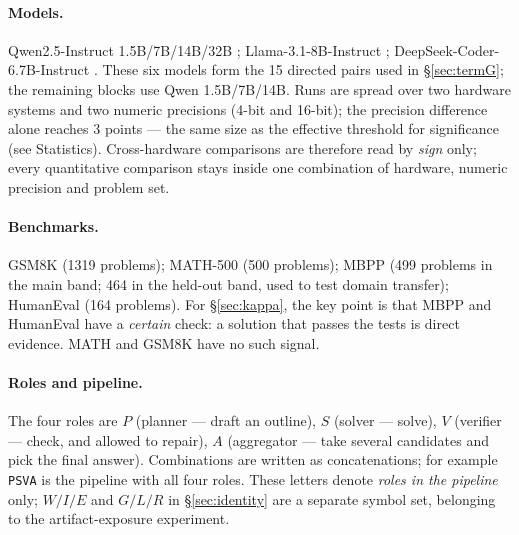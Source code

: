 \documentclass[11pt,a4paper]{article}
\begin{document}
\paragraph{Models.} Qwen2.5-Instruct 1.5B/7B/14B/32B \cite{yang2024}; Llama-3.1-8B-Instruct
\cite{grattafiori2024}; DeepSeek-Coder-6.7B-Instruct \cite{guo2024}. These six models form the 15
directed pairs used in \S\ref{sec:termG}; the remaining blocks use Qwen 1.5B/7B/14B. Runs are
spread over two hardware systems and two numeric precisions (4-bit and 16-bit); the precision
difference alone reaches 3 points --- the same size as the effective threshold for significance
(see Statistics). Cross-hardware comparisons are therefore read by \emph{sign} only; every
quantitative comparison stays inside one combination of hardware, numeric precision and problem
set.

\paragraph{Benchmarks.} GSM8K \cite{cobbe2021} (1319 problems); MATH-500 \cite{hendrycks2021}
(500 problems); MBPP \cite{austin2021} (499 problems in the main band; 464 in the held-out band,
used to test domain transfer); HumanEval \cite{chen2021} (164 problems). For \S\ref{sec:kappa},
the key point is that MBPP and HumanEval have a \emph{certain} check: a solution that passes the
tests is direct evidence. MATH and GSM8K have no such signal.

\paragraph{Roles and pipeline.} The four roles are $P$ (planner --- draft an outline), $S$
(solver --- solve), $V$ (verifier --- check, and allowed to repair), $A$ (aggregator --- take
several candidates and pick the final answer). Combinations are written as concatenations; for
example \texttt{PSVA} is the pipeline with all four roles. These letters denote \emph{roles in
the pipeline} only; $W/I/E$ and $G/L/R$ in \S\ref{sec:identity} are a separate symbol set,
belonging to the artifact-exposure experiment.
\end{document}
